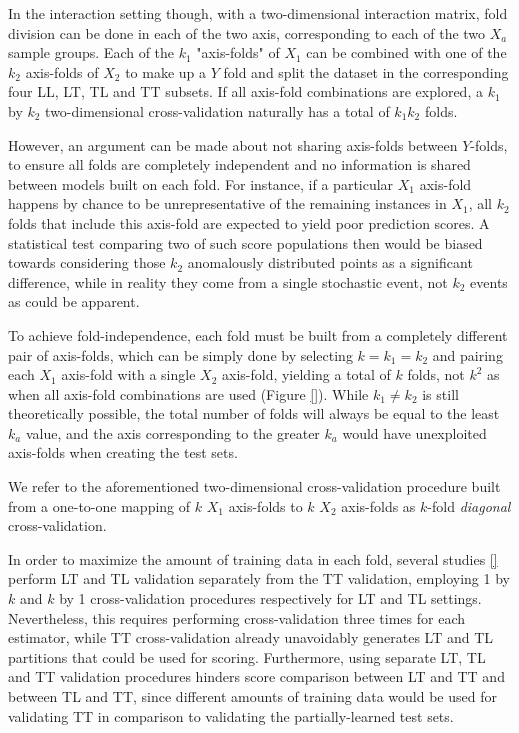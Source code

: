 \documentclass[conference]{IEEEtran}
\begin{document}
In the interaction setting though, with a two-dimensional interaction matrix, fold division can be done in each of the two axis, corresponding to each of the two $X_a$ sample groups. Each of the $k_1$ "axis-folds" of $X_1$ can be combined with one of the $k_2$ axis-folds of $X_2$ to make up a $Y$ fold and split the dataset in the corresponding four LL, LT, TL and TT subsets. If all axis-fold combinations are explored, a $k_1$ by $k_2$ two-dimensional cross-validation naturally has a total of $k_1k_2$ folds. 

However, an argument can be made about not sharing axis-folds between $Y$-folds, to ensure all folds are completely independent and no information is shared between models built on each fold. For instance, if a particular $X_1$ axis-fold happens by chance to be unrepresentative of the remaining instances in $X_1$, all $k_2$ folds that include this axis-fold are expected to yield poor prediction scores. A statistical test comparing two of such score populations then would be biased towards considering those $k_2$ anomalously distributed points as a significant difference, while in reality they come from a single stochastic event, not $k_2$ events as could be apparent.

To achieve fold-independence, each fold must be built from a completely different pair of axis-folds, which can be simply done by selecting $k=k_1=k_2$ and pairing each $X_1$ axis-fold with a single $X_2$ axis-fold, yielding a total of $k$ folds, not $k^2$ as when all axis-fold combinations are used (Figure \ref{}). While $k_1\neq k_2$ is still theoretically possible, the total number of folds will always be equal to the least $k_a$ value, and the axis corresponding to the greater $k_a$ would have unexploited axis-folds when creating the test sets.

We refer to the aforementioned two-dimensional cross-validation procedure built from a one-to-one mapping of $k$ $X_1$ axis-folds to $k$ $X_2$ axis-folds as $k$-fold \emph{diagonal} cross-validation.


In order to maximize the amount of training data in each fold, several studies \ref{} perform LT and TL validation separately from the TT validation, employing 1 by $k$ and $k$ by 1 cross-validation procedures respectively for LT and TL settings. Nevertheless, this requires performing cross-validation three times for each estimator, while TT cross-validation already unavoidably generates LT and TL partitions that could be used for scoring. Furthermore, using separate LT, TL and TT validation procedures hinders score comparison between LT and TT and between TL and TT, since different amounts of training data would be used for validating TT in comparison to validating the partially-learned test sets.
\end{document}

